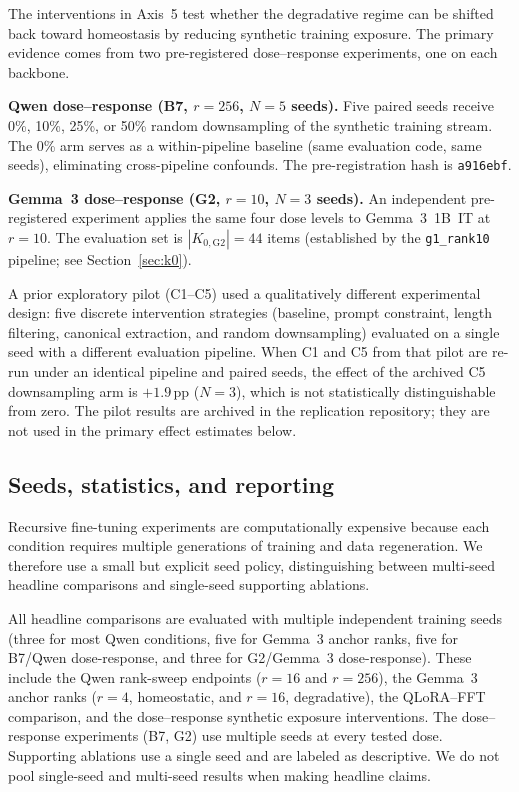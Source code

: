 \documentclass[a4paper,fleqn]{cas-dc}
\newif\ifshowchanges
\newcommand{\rev}[1]{\ifshowchanges{\color{blue}#1}\else{#1}\fi}
\begin{document}
\rev{The interventions in Axis~5 test whether the degradative regime can be shifted
back toward homeostasis by reducing synthetic training exposure. The primary
evidence comes from two pre-registered dose--response experiments, one on each
backbone.

\textbf{Qwen dose--response (B7, $r=256$, \rev{$N=5$} seeds).}
Five paired seeds receive 0\%, 10\%, 25\%, or 50\% random downsampling of the
synthetic training stream. The 0\% arm serves as a within-pipeline baseline
(same evaluation code, same seeds), eliminating cross-pipeline confounds. The
pre-registration hash is \texttt{a916ebf}.

\textbf{Gemma~3 dose--response (G2, $r=10$, \rev{$N=3$} seeds).}
An independent pre-registered experiment applies the same four dose levels to
Gemma~3~1B~IT at $r=10$. The evaluation set is $|K_{0,\mathrm{G2}}|=44$ items
(established by the \texttt{g1\_rank10} pipeline; see Section~\ref{sec:k0}).

}
\rev{A prior exploratory pilot (C1--C5) used a qualitatively different
experimental design: five discrete intervention strategies (baseline, prompt
constraint, length filtering, canonical extraction, and random downsampling)
evaluated on a single seed with a different evaluation pipeline. When C1 and C5
from that pilot are re-run under an identical pipeline and paired seeds, \rev{the effect of the archived C5 downsampling arm is $+1.9$\,pp ($N=3$), which is not}
statistically distinguishable from zero. The pilot results are archived in the
replication repository; they are not used in the primary effect estimates below.}

\subsection{Seeds, statistics, and reporting}\label{sec:statistics}

Recursive fine-tuning experiments are computationally expensive because each
condition requires multiple generations of training and data regeneration. We
therefore use a small but explicit seed policy, distinguishing between
multi-seed headline comparisons and single-seed supporting ablations.

All headline comparisons are evaluated with multiple independent training seeds
\rev{(three for most Qwen conditions, five for Gemma~3 anchor ranks, five for B7/Qwen dose-response, and three for G2/Gemma~3 dose-response)}. These
include the Qwen rank-sweep endpoints ($r=16$ and $r=256$), the Gemma~3 anchor
\rev{ranks ($r=4$, homeostatic, and $r=16$, degradative), the QLoRA--FFT comparison, and the dose--response synthetic}
exposure interventions. \rev{The dose--response experiments (B7, G2) use multiple seeds at
every tested dose. Supporting ablations use a single seed and are
labeled as descriptive.} We do not pool
single-seed and multi-seed results when making headline claims.
\end{document}
